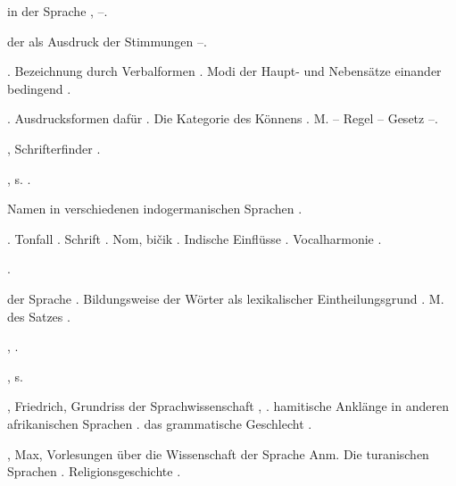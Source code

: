 \begin{register}
 in der Sprache \pageref{sp.126}, \pageref{sp.249}–\pageref{sp.250}.

 der  als Ausdruck der Stimmungen \pageref{sp.376}–\pageref{sp.380}.

. Bezeichnung durch Verbalformen \pageref{sp.383}. Modi der Haupt- und Nebensätze einander bedingend \pageref{sp.465}.

. Ausdrucksformen dafür \pageref{sp.95}. Die Kategorie des Könnens \pageref{sp.103}. M. – Regel – Gesetz \pageref{sp.385}–\pageref{sp.387}.

, Schrifterfinder \pageref{sp.131}.

, s. . 

 Namen in verschiedenen indogermanischen Sprachen \pageref{sp.154}.

. Tonfall \pageref{sp.34}. Schrift \pageref{sp.131}. Nom, bičik \pageref{sp.264}. Indische Einflüsse \pageref{sp.271}. Vocalharmonie \pageref{sp.402}.

 \pageref{sp.306}.

 der Sprache \pageref{sp.17}. Bildungsweise der Wörter als lexikalischer Eintheilungsgrund \pageref{sp.123}. M. des Satzes \pageref{sp.149}.



 \pageref{sp.36}, \pageref{sp.182}.

, s. 



, Friedrich, Grundriss der Sprachwissenschaft \pageref{sp.28}, \pageref{sp.51}.  hamitische Anklänge in anderen afrikanischen Sprachen \pageref{sp.161}.   das grammatische Geschlecht \pageref{sp.481}.

, Max, Vorlesungen über die Wissenschaft der Sprache \pageref{sp.52} Anm. Die turanischen Sprachen \pageref{sp.155}. Religionsgeschichte \pageref{sp.294}. 


\end{register}
